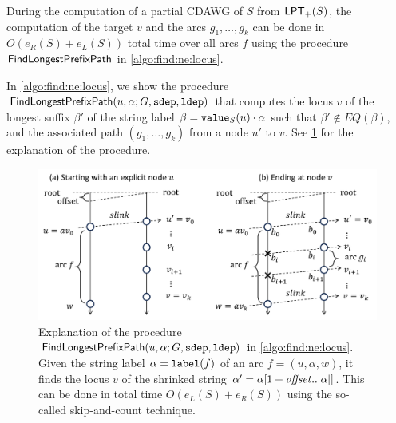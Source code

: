 \documentclass{article}
\begin{document}
\begin{lemma}\label{lem:find:ne:locus}
  During the computation of a partial CDAWG of $S$ from $\mathsf{LPT}_{+}(S)$, 
  the computation of the target $v$ and the arcs $g_1, \dots, g_k$ can be done in $O(e_R(S)+e_L(S))$ total time over all arcs $f$ using the procedure  $\textsf{FindLongestPrefixPath}$ in \cref{algo:find:ne:locus}. 
\end{lemma}


\begin{toappendix}
In \cref{algo:find:ne:locus}, we show the procedure $\textsf{FindLongestPrefixPath}(u, \alpha; G, \mathtt{sdep}, \mathtt{ldep})$ that computes the locus $v$ of the longest suffix $\beta'$ of the string label $\beta = \mathtt{value}_{S}(u)\cdot\alpha$ such that $\beta' \not\in EQ(\beta)$, and the associated path $(g_1, \dots, g_k)$ from a node $u'$ to $v$.
See \cref{fig:three:suffix:link} for the explanation of the procedure.

\begin{figure}[t]
\centering
\includegraphics[height=0.4\textwidth]{fig3.pdf}
\vspace{.5\baselineskip}
\caption{Explanation of the procedure $\textsf{FindLongestPrefixPath}(u, \alpha; G, \mathtt{sdep}, \mathtt{ldep})$ in \cref{algo:find:ne:locus}. Given the string label $\alpha = \mathtt{label}(f)$ of an arc $f = (u, \alpha, w)$, it finds the locus $v$ of the shrinked string $\alpha' = \alpha[1+\mathit{offset}..|\alpha|]$. This can be done in total time $O(e_L(S) + e_R(S))$ using the so-called skip-and-count technique.}
\label{fig:three:suffix:link}
\end{figure}


\end{toappendix}
\end{document}
